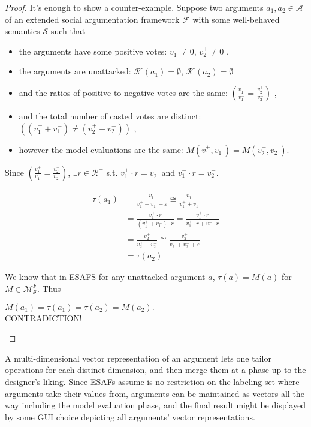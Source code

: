 \documentclass{article}
\newcommand{\args}{\mathcal{A}} %
\newcommand{\att}{\mathcal{R}}  %
\newcommand{\attackers}[1]{\att^\text{-}\left(#1\right)}
\begin{document}
\begin{proof}
It's enough to show a counter-example. Suppose  two arguments $a_1, a_2 \in \args$ of an extended social argumentation framework $\mathcal{F}$ with some well-behaved semantics $\mathcal{S}$ such that
\begin{itemize}
\item the arguments have some positive votes:  $v^+_1 \neq 0$, $v^+_2 \neq 0$  ,
\item the arguments are unattacked:      $\attackers {a _1}= \emptyset$, $\attackers {a_2}= \emptyset$
\item and the ratios of positive to negative votes are the same:  $ \left( \frac{v^+_1} {v^-_1} = \frac{v^+_2} {v^-_2} \right)$ ,
\item and the total number of casted votes are distinct:   $\left(( v^+_1 + v^-_1) \neq ( v^+_2 + v^-_2) \right)$ ,
\item however the model evaluations are the same: $M(v^+_1, v^-_1) = M(v^+_2, v^-_2)$. \\
\end{itemize}


Since $(\frac{v_1^+}{v_1^-} = \frac{v_2^+}{v_2^-})$, $\exists r \in \mathcal{R}^+$ s.t. $v_1^+ \cdot r = v_2^+$ and $v_1^- \cdot r = v_2^-$.

 \begin{align*}
    \tau(a_1) &= \frac{v^{+}_1}{v^{+}_1+v^{-}_1+\varepsilon} \cong  \frac{v^{+}_1}{v^{+}_1+v^{-}_1} \\%
         &=  \frac{v^{+}_1 \cdot r}{(v^{+}_1+v^{-}_1) \cdot r} =  \frac{v^{+}_1 \cdot r}{v^{+}_1 \cdot r + v^{-}_1 \cdot r  } \\
         &= \frac{v^{+}_2}{v^{+}_2+v^{-}_2} \cong  \frac{v^{+}_2}{v^{+}_2+v^{-}_2+\varepsilon} \\
         &= \tau(a_2)
  \end{align*}

We know that in ESAFS for any unattacked argument $a$, $\tau(a) = M(a)$ for $M \in \mathcal{M}^F_{\mathcal{S}}$. Thus
\begin{center}
$M(a_1) = \tau(a_1) = \tau(a_2) = M(a_2).$\\
CONTRADICTION!
\end{center}

\end{proof}

A multi-dimensional vector representation of an argument lets one tailor operations for each distinct dimension, and then merge them at a phase up to the designer's liking. Since ESAFs assume is no restriction on the labeling set where arguments take their values from, arguments can be maintained as vectors all the way including the model evaluation phase, and the final result might be displayed by some GUI choice depicting all arguments' vector representations. 
\end{document}
